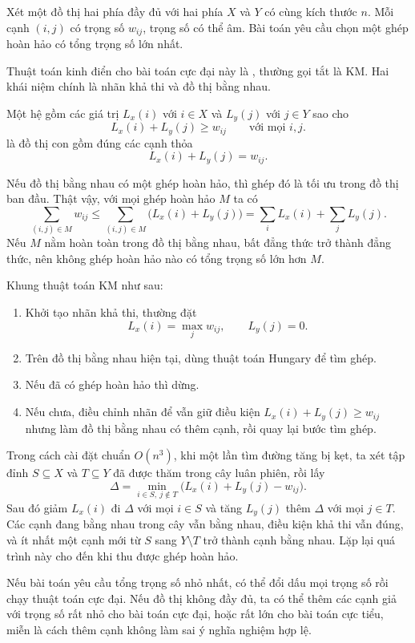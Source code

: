 \documentclass[11pt]{article}
\begin{document}
Xét một đồ thị hai phía đầy đủ với hai phía $X$ và $Y$ có cùng kích thước $n$.
Mỗi cạnh $(i,j)$ có trọng số $w_{ij}$, trọng số có thể âm. Bài toán
 yêu cầu chọn một ghép hoàn hảo có tổng trọng số
lớn nhất.

Thuật toán kinh điển cho bài toán cực đại này là , thường
gọi tắt là KM. Hai khái niệm chính là nhãn khả thi và đồ thị bằng nhau.

Một hệ  gồm các giá trị $L_x(i)$ với $i\in X$ và $L_y(j)$
với $j\in Y$ sao cho
\[
  L_x(i)+L_y(j)\ge w_{ij}
  \qquad\text{với mọi }i,j.
\]
 là đồ thị con gồm đúng các cạnh thỏa
\[
  L_x(i)+L_y(j)=w_{ij}.
\]

Nếu đồ thị bằng nhau có một ghép hoàn hảo, thì ghép đó là tối ưu trong đồ thị
ban đầu. Thật vậy, với mọi ghép hoàn hảo $M$ ta có
\[
  \sum_{(i,j)\in M} w_{ij}
  \le
  \sum_{(i,j)\in M} \bigl(L_x(i)+L_y(j)\bigr)
  =
  \sum_i L_x(i)+\sum_j L_y(j).
\]
Nếu $M$ nằm hoàn toàn trong đồ thị bằng nhau, bất đẳng thức trở thành đẳng
thức, nên không ghép hoàn hảo nào có tổng trọng số lớn hơn $M$.

Khung thuật toán KM như sau:
\begin{enumerate}
  \item Khởi tạo nhãn khả thi, thường đặt
  \[
    L_x(i)=\max_j w_{ij},\qquad L_y(j)=0.
  \]
  \item Trên đồ thị bằng nhau hiện tại, dùng thuật toán Hungary để tìm ghép.
  \item Nếu đã có ghép hoàn hảo thì dừng.
  \item Nếu chưa, điều chỉnh nhãn để vẫn giữ điều kiện
  $L_x(i)+L_y(j)\ge w_{ij}$ nhưng làm đồ thị bằng nhau có thêm cạnh, rồi quay
  lại bước tìm ghép.
\end{enumerate}

Trong cách cài đặt chuẩn $O(n^3)$, khi một lần tìm đường tăng bị kẹt, ta xét
tập đỉnh $S\subseteq X$ và $T\subseteq Y$ đã được thăm trong cây luân phiên,
rồi lấy
\[
  \Delta=\min_{i\in S,\ j\notin T}
  \bigl(L_x(i)+L_y(j)-w_{ij}\bigr).
\]
Sau đó giảm $L_x(i)$ đi $\Delta$ với mọi $i\in S$ và tăng $L_y(j)$ thêm
$\Delta$ với mọi $j\in T$. Các cạnh đang bằng nhau trong cây vẫn bằng nhau,
điều kiện khả thi vẫn đúng, và ít nhất một cạnh mới từ $S$ sang $Y\setminus T$
trở thành cạnh bằng nhau. Lặp lại quá trình này cho đến khi thu được ghép hoàn
hảo.

Nếu bài toán yêu cầu tổng trọng số nhỏ nhất, có thể đổi dấu mọi trọng số rồi
chạy thuật toán cực đại. Nếu đồ thị không đầy đủ, ta có thể thêm các cạnh giả
với trọng số rất nhỏ cho bài toán cực đại, hoặc rất lớn cho bài toán cực tiểu,
miễn là cách thêm cạnh không làm sai ý nghĩa nghiệm hợp lệ.
\end{document}
